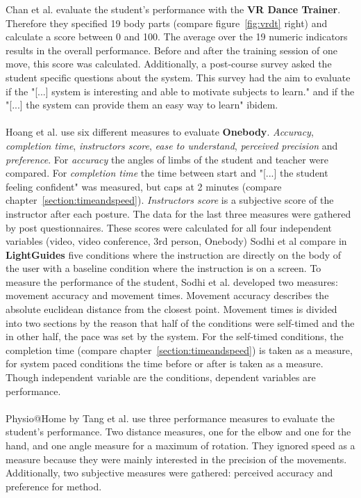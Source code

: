 Chan et al. evaluate the student's performance with the \textbf{VR Dance Trainer}. Therefore they specified 19 body parts (compare figure~\ref{fig:vrdt} right) and calculate a score between 0 and 100. The average over the 19 numeric indicators results in the overall performance. Before and after the training session of one move, this score was calculated. Additionally, a post-course survey asked the student specific questions about the system. This survey had the aim to evaluate if the "[...] system is interesting and able to motivate subjects to learn." \cite{Chan2010} and if the "[...] the system can provide them an easy way to learn" ibidem.\\ \\
Hoang et al. \cite{Hoang2016} use six different measures to evaluate \textbf{Onebody}. \textit{Accuracy}, \textit{completion time}, \textit{instructors score}, \textit{ease to understand}, \textit{perceived precision} and \textit{preference}. For \textit{accuracy} the angles of limbs of the student and teacher were compared. For \textit{completion time} the time between start and "[...] the student feeling confident" was measured, but caps at 2 minutes (compare chapter~\ref{section:timeandspeed}). \textit{Instructors score} is a subjective score of the instructor after each posture. The data for the last three measures were gathered by post questionnaires. These scores were calculated for all four independent variables (video, video conference, 3rd person, Onebody)
Sodhi et al \cite{Sodhi2012} compare in \textbf{LightGuides} five conditions where the instruction are directly on the body of the user with a baseline condition where the instruction is on a screen. To measure the performance of the student, Sodhi et al. developed two measures: movement accuracy and movement times. Movement accuracy describes the absolute euclidean distance from the closest point. Movement times is divided into two sections by the reason that half of the conditions were self-timed and the in other half, the pace was set by the system. For the self-timed conditions, the completion time (compare chapter~\ref{section:timeandspeed}) is taken as a measure, for system paced conditions the time before or after is taken as a measure. Though independent variable are the conditions, dependent variables are performance.\\ \\
Physio@Home by Tang et al. \cite{Tang2015} use three performance measures to evaluate the student's performance. Two distance measures, one for the elbow and one for the hand, and one angle measure for a maximum of rotation. They ignored speed as a measure because they were mainly interested in the precision of the movements. Additionally, two subjective measures were gathered: perceived accuracy and preference for method.

